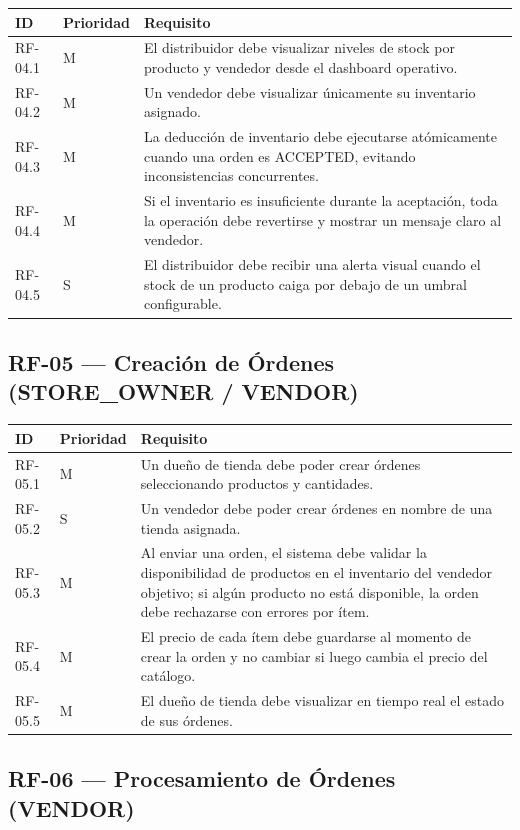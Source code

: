 \documentclass[12pt,a4paper]{report}
\begin{document}
\begin{longtable}{|p{2cm}|p{2cm}|p{10cm}|}
\hline
\textbf{ID} & \textbf{Prioridad} & \textbf{Requisito} \\ \hline
RF-04.1 & M & El distribuidor debe visualizar niveles de stock por producto y vendedor desde el dashboard operativo. \\ \hline
RF-04.2 & M & Un vendedor debe visualizar únicamente su inventario asignado. \\ \hline
RF-04.3 & M & La deducción de inventario debe ejecutarse atómicamente cuando una orden es ACCEPTED, evitando inconsistencias concurrentes. \\ \hline
RF-04.4 & M & Si el inventario es insuficiente durante la aceptación, toda la operación debe revertirse y mostrar un mensaje claro al vendedor. \\ \hline
RF-04.5 & S & El distribuidor debe recibir una alerta visual cuando el stock de un producto caiga por debajo de un umbral configurable. \\ \hline
\end{longtable}

\subsection{RF-05 --- Creación de Órdenes (STORE\_OWNER / VENDOR)}

\begin{longtable}{|p{2cm}|p{2cm}|p{10cm}|}
\hline
\textbf{ID} & \textbf{Prioridad} & \textbf{Requisito} \\ \hline
RF-05.1 & M & Un dueño de tienda debe poder crear órdenes seleccionando productos y cantidades. \\ \hline
RF-05.2 & S & Un vendedor debe poder crear órdenes en nombre de una tienda asignada. \\ \hline
RF-05.3 & M & Al enviar una orden, el sistema debe validar la disponibilidad de productos en el inventario del vendedor objetivo; si algún producto no está disponible, la orden debe rechazarse con errores por ítem. \\ \hline
RF-05.4 & M & El precio de cada ítem debe guardarse al momento de crear la orden y no cambiar si luego cambia el precio del catálogo. \\ \hline
RF-05.5 & M & El dueño de tienda debe visualizar en tiempo real el estado de sus órdenes. \\ \hline
\end{longtable}

\subsection{RF-06 --- Procesamiento de Órdenes (VENDOR)}
\end{document}
